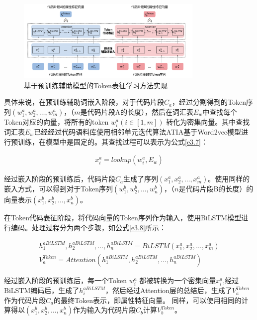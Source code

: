 \begin{figure}[H]
  \centering
  \includegraphics[width=0.8\textwidth]{figures/token}
  \caption{基于预训练辅助模型的Token表征学习方法实现}\label{fig:token}
\end{figure}

具体来说，在预训练辅助词嵌入阶段，对于代码片段$C_{a}$，经过分割得到的Token序列$\left( w_{1}^{a},w_{2}^{a},\ldots,w_{m}^{a}\right)$，（$m$是代码片段A的长度），然后在词汇表$E_{w}$中查找每个Token对应的向量，将所有的token $w_{i}^{a} \left(i \in [1,m]\right)$ 转化为密集向量。其中查找词汇表$E_{w}$已经经过代码语料库使用相邻单元迭代算法ATIA基于Word2vec模型进行预训练，在模型中是固定的。其查找过程可以表示为公式\ref{e3.7}：

\begin{equation}\label{e3.7}
  \begin{split}
  x_{i}^{a} = lookup \left(w_{i}^{a} ,E_{w} \right)
  \end{split}
\end{equation}

经过嵌入阶段的预训练后，代码片段$C_{a}$生成了序列$\left( x_{1}^{a},x_{2}^{a},\ldots,x_{m}^{a}\right)$。使用同样的嵌入方式，可以得到对于Token序列$\left( w_{1}^{b},w_{2}^{b},\ldots,w_{n}^{b}\right)$，（$n$是代码片段B的长度）的向量表示$\left( x_{1}^{b},x_{2}^{b},\ldots,x_{n}^{b} \right)$。

在Token代码表征阶段，将代码向量的Token序列作为输入，使用BiLSTM模型进行编码。处理过程分为两个步骤，如公式\ref{e3.8}所示：

\begin{equation}\label{e3.8}
  \begin{split}
    h_{1}^{aBiLSTM},h_{2}^{aBiLSTM},\ldots,h_{n}^{aBiLSTM} = BiLSTM \left(x_{1}^{a},x_{2}^{a},\ldots,x_{m}^{a}\right) \\
    V_{a}^{Token} = Attention \left( h_{1}^{aBiLSTM},h_{2}^{aBiLSTM},\ldots,h_{n}^{aBiLSTM} \right)
  \end{split}
\end{equation}

经过嵌入阶段的预训练后，每一个Token $w_{i}^{a}$ 都被转换为一个密集向量$x_{i}^{a}$,经过BiLSTM编码后，生成了$h_{i}^{aBiLSTM}$，然后经过Attention层的总结后，生成了$V_{a}^{Token}$作为代码片段$C_{a}$的最终Token表示，即属性特征向量。
同样，可以使用相同的计算得以$\left( x_{1}^{b},x_{2}^{b},\ldots,x_{n}^{b} \right)$作为输入为代码片段$C_{b}$计算$V_{b}^{Token}$。

